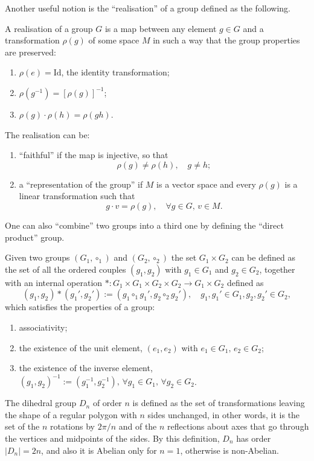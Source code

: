 Another useful notion is the ``realisation'' of a group defined as the following.
\begin{defn}
    A realisation of a group $G$ is a map between any element $g\in G$ and a transformation $\rho(g)$ of some space $M$ in such a way that the group properties are preserved:
    \begin{enumerate}
        \item $\rho(e) = \mathrm{Id}$, the identity transformation;
        \item $\rho(g^{-1}) = [\rho(g)]^{-1}$;
        \item $\rho(g) \cdot \rho(h) = \rho(gh)$.
    \end{enumerate}
    The realisation can be:
    \begin{enumerate}
        \item ``faithful'' if the map is injective, so that
        \begin{equation}
            \rho(g) \neq \rho(h),\quad g \neq h;
        \end{equation}
        \item a ``representation of the group'' if $M$ is a vector space and every $\rho(g)$ is a linear transformation such that 
        \begin{equation}
            g \cdot v = \rho(g),\quad \forall g \in G,\,v\in M.
        \end{equation}
    \end{enumerate}
\end{defn}
One can also ``combine'' two groups into a third one by defining the ``direct product'' group.
\begin{defn}
    Given two groups $(G_1,\circ_1)$ and $(G_2,\circ_2)$ the set $G_1 \times G_2$ can be defined as the set of all the ordered couples $(g_1,g_2)$ with $g_1 \in G_1$ and $g_2 \in G_2$, together with an internal operation $* : G_1 \times G_1 \times G_2 \times G_2 \to G_1 \times G_2$ defined as
    \begin{equation}
        (g_1,g_2) * (g_1',g_2') := (g_1\circ_1 g_1',g_2\circ_2 g_2'),\quad g_1,g_1'\in G_1,g_2,g_2'\in G_2,
    \end{equation}
    which satisfies the properties of a group:
    \begin{enumerate}
        \item associativity;
        \item the existence of the unit element, $(e_1,e_2)$ with $e_1\in G_1, \,e_2\in G_2$;
        \item the existence of the inverse element, $(g_1,g_2)^{-1} := (g_1^{-1},g_2^{-1}),\,\forall g_1\in G_1,\,\forall g_2 \in G_2$.
    \end{enumerate}
\end{defn}
The dihedral group $D_n$ of order $n$ is defined as the set of transformations leaving the shape of a regular polygon with $n$ sides unchanged, in other words, it is the set of the $n$ rotations by $2\pi/n$ and of the $n$ reflections about axes that go through the vertices and midpoints of the sides. By this definition, $D_n$ has order $|D_n| = 2n$, and also it is Abelian only for $n = 1$, otherwise is non-Abelian. 

